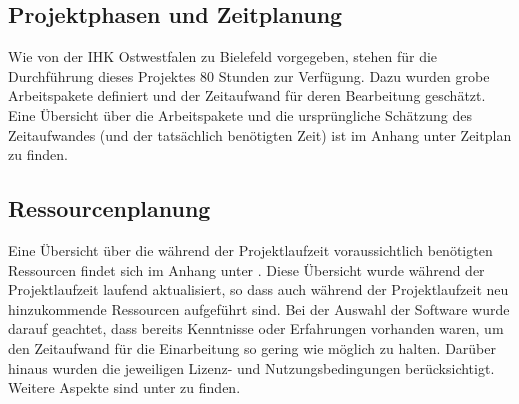 \subsection{Projektphasen und Zeitplanung}

Wie von der IHK Ostwestfalen zu Bielefeld vorgegeben, stehen für die Durchführung dieses Projektes 80 Stunden zur Verfügung. Dazu wurden grobe Arbeitspakete definiert und der Zeitaufwand für deren Bearbeitung geschätzt. Eine Übersicht über die Arbeitspakete und die ursprüngliche Schätzung des Zeitaufwandes (und der tatsächlich benötigten Zeit) ist im Anhang unter Zeitplan  zu finden.


\subsection{Ressourcenplanung}

Eine Übersicht über die während der Projektlaufzeit voraussichtlich benötigten Ressourcen findet sich im Anhang unter . Diese Übersicht wurde während der Projektlaufzeit laufend aktualisiert, so dass auch während der Projektlaufzeit neu hinzukommende Ressourcen aufgeführt sind.
Bei der Auswahl der Software wurde darauf geachtet, dass bereits Kenntnisse oder Erfahrungen vorhanden waren, um den Zeitaufwand für die Einarbeitung so gering wie möglich zu halten. Darüber hinaus wurden die jeweiligen Lizenz- und Nutzungsbedingungen berücksichtigt. Weitere Aspekte sind unter  zu finden.
